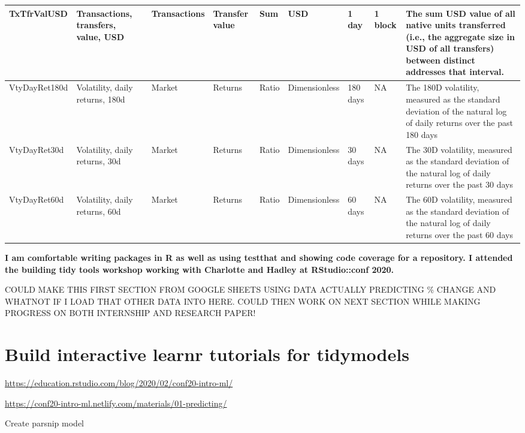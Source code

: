 \documentclass[
]{book}
\newenvironment{Shaded}{\begin{snugshade}}{\end{snugshade}}
\newcommand{\KeywordTok}[1]{\textcolor[rgb]{0.13,0.29,0.53}{\textbf{#1}}}
\newcommand{\NormalTok}[1]{#1}
\newcommand{\OperatorTok}[1]{\textcolor[rgb]{0.81,0.36,0.00}{\textbf{#1}}}
\newcommand{\StringTok}[1]{\textcolor[rgb]{0.31,0.60,0.02}{#1}}
\begin{document}
\begin{tabular}{l|l|l|l|l|l|l|l|l}
\hline
TxTfrValUSD & Transactions, transfers, value, USD & Transactions & Transfer value & Sum & USD & 1 day & 1 block & The sum USD value of all native units transferred (i.e., the aggregate size in USD of all transfers) between distinct addresses that interval.\\
\hline
VtyDayRet180d & Volatility, daily returns, 180d & Market & Returns & Ratio & Dimensionless & 180 days & NA & The 180D volatility, measured as the standard deviation of the natural log of daily returns over the past 180 days\\
\hline
VtyDayRet30d & Volatility, daily returns, 30d & Market & Returns & Ratio & Dimensionless & 30 days & NA & The 30D volatility, measured as the standard deviation of the natural log of daily returns over the past 30 days\\
\hline
VtyDayRet60d & Volatility, daily returns, 60d & Market & Returns & Ratio & Dimensionless & 60 days & NA & The 60D volatility, measured as the standard deviation of the natural log of daily returns over the past 60 days\\
\hline
\end{tabular}

\textbf{I am comfortable writing packages in R as well as using testthat and showing code coverage for a repository. I attended the building tidy tools workshop working with Charlotte and Hadley at RStudio::conf 2020.}

COULD MAKE THIS FIRST SECTION FROM GOOGLE SHEETS USING DATA ACTUALLY PREDICTING \% CHANGE AND WHATNOT IF I LOAD THAT OTHER DATA INTO HERE. COULD THEN WORK ON NEXT SECTION WHILE MAKING PROGRESS ON BOTH INTERNSHIP AND RESEARCH PAPER!

\hypertarget{build-interactive-learnr-tutorials-for-tidymodels}{%
\section{Build interactive learnr tutorials for tidymodels}\label{build-interactive-learnr-tutorials-for-tidymodels}}

\url{https://education.rstudio.com/blog/2020/02/conf20-intro-ml/}

\url{https://conf20-intro-ml.netlify.com/materials/01-predicting/}

Create parsnip model

\begin{Shaded}
\end{Shaded}
\end{document}
